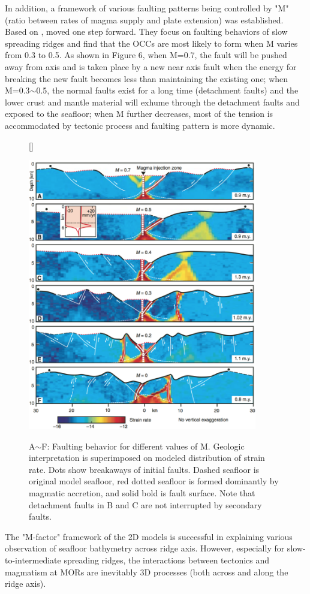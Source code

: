 \documentclass[12pt]{article}
\begin{document}
In addition, a framework of various faulting patterns being controlled by "M" (ratio between rates of magma supply and plate extension) was established. Based on \citep{Buck2005}, \citep{Tucholke2008} moved one step forward. They focus on faulting behaviors of slow spreading ridges and find that the OCCs are most likely to form when M varies from 0.3 to 0.5. As shown in Figure 6, when M=0.7, the fault will be pushed away from axis and is taken place by a new near axis fault when the energy for breaking the new fault becomes less than maintaining the existing one; when M=0.3$\sim$0.5, the normal faults exist for a long time (detachment faults) and the lower crust and mantle material will exhume through the detachment faults and exposed to the seafloor; when M further decreases, most of the tension is accommodated by tectonic process and faulting pattern is more dynamic.
\begin{figure}[H]
[\FBwidth]
{\caption{\small A$\sim$F: Faulting behavior for different values of M. Geologic interpretation is superimposed on modeled distribution of strain rate. Dots show breakaways of initial faults. Dashed seafloor is original model seafloor, red dotted seafloor is formed dominantly by magmatic accretion, and solid bold is fault surface. Note that detachment faults in B and C are not interrupted by secondary faults. \citep{Tucholke2008}}}
 {\includegraphics[width=10cm]{fig6_1.png}} 
 \label{fig6_1}
\end{figure}
The "M-factor" framework of the 2D models is successful in explaining various observation of seafloor bathymetry across ridge axis. However, especially for slow-to-intermediate spreading ridges, the interactions between tectonics and magmatism at MORs are inevitably 3D processes (both across and along the ridge axis).
\end{document}
